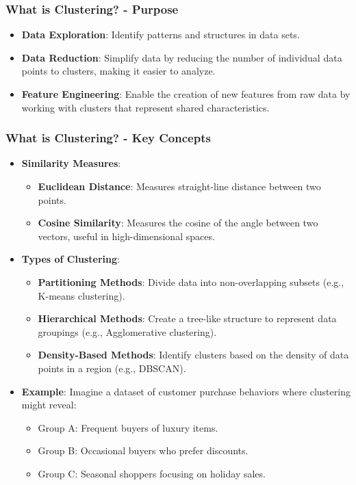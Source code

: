 \documentclass[aspectratio=169]{beamer}
\begin{document}
\begin{frame}[fragile]
    \frametitle{What is Clustering? - Purpose}
    \begin{itemize}
        \item \textbf{Data Exploration}: Identify patterns and structures in data sets.
        \item \textbf{Data Reduction}: Simplify data by reducing the number of individual data points to clusters, making it easier to analyze.
        \item \textbf{Feature Engineering}: Enable the creation of new features from raw data by working with clusters that represent shared characteristics.
    \end{itemize}
\end{frame}

\begin{frame}[fragile]
    \frametitle{What is Clustering? - Key Concepts}
    \begin{itemize}
        \item \textbf{Similarity Measures}:
        \begin{itemize}
            \item \textbf{Euclidean Distance}: Measures straight-line distance between two points.
            \item \textbf{Cosine Similarity}: Measures the cosine of the angle between two vectors, useful in high-dimensional spaces.
        \end{itemize}
        
        \item \textbf{Types of Clustering}:
        \begin{itemize}
            \item \textbf{Partitioning Methods}: Divide data into non-overlapping subsets (e.g., K-means clustering).
            \item \textbf{Hierarchical Methods}: Create a tree-like structure to represent data groupings (e.g., Agglomerative clustering).
            \item \textbf{Density-Based Methods}: Identify clusters based on the density of data points in a region (e.g., DBSCAN).
        \end{itemize}
        
        \item \textbf{Example}:
        Imagine a dataset of customer purchase behaviors where clustering might reveal:
        \begin{itemize}
            \item Group A: Frequent buyers of luxury items.
            \item Group B: Occasional buyers who prefer discounts.
            \item Group C: Seasonal shoppers focusing on holiday sales.
        \end{itemize}
    \end{itemize}
\end{frame}
\end{document}
